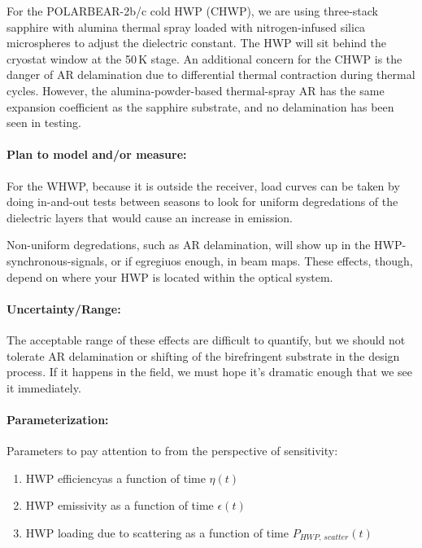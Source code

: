 For the POLARBEAR-2b/c cold HWP (CHWP), we are using three-stack sapphire with alumina thermal spray loaded with nitrogen-infused silica microspheres to adjust the dielectric constant. The HWP will sit behind the cryostat window at the 50\,K stage. An additional concern for the CHWP is the danger of AR delamination due to differential thermal contraction during thermal cycles. However, the alumina-powder-based thermal-spray AR has the same expansion coefficient as the sapphire substrate, and no delamination has been seen in testing.
  
\paragraph{Plan to model and/or measure:}

For the WHWP, because it is outside the receiver, load curves can be taken by doing in-and-out tests between seasons to look for uniform degredations of the dielectric layers that would cause an increase in emission. 

Non-uniform degredations, such as AR delamination, will show up in the HWP-synchronous-signals, or if egregiuos enough, in beam maps. These effects, though, depend on where your HWP is located within the optical system.

\paragraph{Uncertainty/Range:}

The acceptable range of these effects are difficult to quantify, but we should not tolerate AR delamination or shifting of the birefringent substrate in the design process. If it happens in the field, we must hope it's dramatic enough that we see it immediately.

\paragraph{Parameterization:}

Parameters to pay attention to from the perspective of sensitivity:

\begin{enumerate}
	\item HWP efficiencyas a function of time $\eta(t)$
	\item HWP emissivity as a function of time $\epsilon(t)$
	\item HWP loading due to scattering as a function of time $P_{HWP, \, scatter}(t)$
\end{enumerate}	
